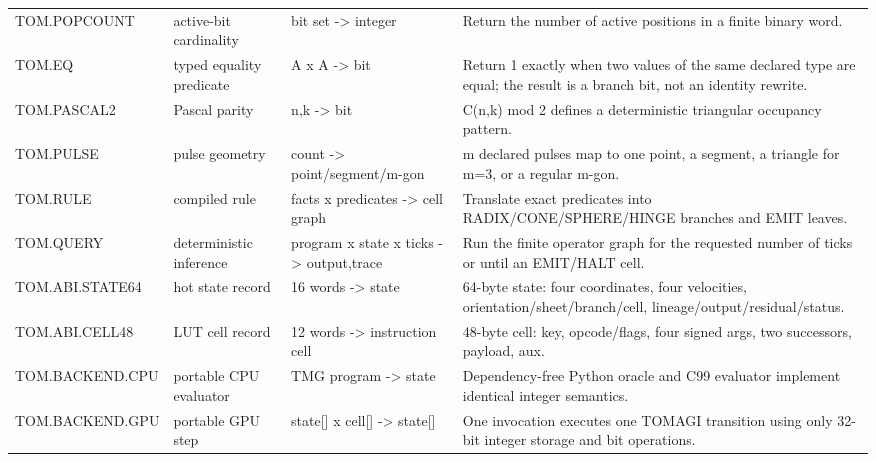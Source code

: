 \begin{longtable}{@{}L{0.18\textwidth}L{0.17\textwidth}L{0.20\textwidth}L{0.39\textwidth}@{}}
TOM.POPCOUNT & active-bit cardinality & bit set -> integer & Return the number of active positions in a finite binary word. \\
TOM.EQ & typed equality predicate & A x A -> bit & Return 1 exactly when two values of the same declared type are equal;\allowbreak{} the result is a branch bit,\allowbreak{} not an identity rewrite. \\
TOM.PASCAL2 & Pascal parity & n,\allowbreak{}k -> bit & C(n,\allowbreak{}k) mod 2 defines a deterministic triangular occupancy pattern. \\
TOM.PULSE & pulse geometry & count -> point/\allowbreak{}segment/\allowbreak{}m-gon & m declared pulses map to one point,\allowbreak{} a segment,\allowbreak{} a triangle for m=3,\allowbreak{} or a regular m-gon. \\
TOM.RULE & compiled rule & facts x predicates -> cell graph & Translate exact predicates into RADIX/\allowbreak{}CONE/\allowbreak{}SPHERE/\allowbreak{}HINGE branches and EMIT leaves. \\
TOM.QUERY & deterministic inference & program x state x ticks -> output,\allowbreak{}trace & Run the finite operator graph for the requested number of ticks or until an EMIT/\allowbreak{}HALT cell. \\
TOM.ABI.STATE64 & hot state record & 16 words -> state & 64-byte state: four coordinates,\allowbreak{} four velocities,\allowbreak{} orientation/\allowbreak{}sheet/\allowbreak{}branch/\allowbreak{}cell,\allowbreak{} lineage/\allowbreak{}output/\allowbreak{}residual/\allowbreak{}status. \\
TOM.ABI.CELL48 & LUT cell record & 12 words -> instruction cell & 48-byte cell: key,\allowbreak{} opcode/\allowbreak{}flags,\allowbreak{} four signed args,\allowbreak{} two successors,\allowbreak{} payload,\allowbreak{} aux. \\
TOM.BACKEND.CPU & portable CPU evaluator & TMG program -> state & Dependency-free Python oracle and C99 evaluator implement identical integer semantics. \\
TOM.BACKEND.GPU & portable GPU step & state[] x cell[] -> state[] & One invocation executes one TOMAGI transition using only 32-bit integer storage and bit operations. \\
\end{longtable}
\normalsize
\endgroup
